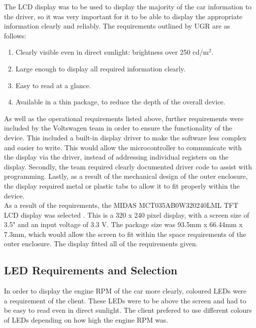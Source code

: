 \documentclass[a4paper,12pt]{article}
\begin{document}
The LCD display was to be used to display the majority of the car information to the driver, so it was very important for it to be able to display the appropriate information clearly and reliably. The requirements outlined by UGR are as follows:

\begin{enumerate}
  \item Clearly visible even in direct sunlight: brightness over 250 cd/$\textrm{m}^2$.
  \item Large enough to display all required information clearly.
  \item Easy to read at a glance.
  \item Available in a thin package, to reduce the depth of the overall device.
\end{enumerate}

As well as the operational requirements listed above, further requirements were included by the Voltswagen team in order to ensure the functionality of the device. This included a built-in display driver to make the software less complex and easier to write. This would allow the microcontroller to communicate with the display via the driver, instead of addressing individual registers on the display. Secondly, the team required clearly documented driver code to assist with programming. Lastly, as a result of the mechanical design of the outer enclosure, the display required metal or plastic tabs to allow it to fit properly within the device. \\

As a result of the requirements, the MIDAS MCT035AB0W320240LML TFT LCD display was selected \cite{display_datasheet}. This is a 320 x 240 pixel display, with a screen size of 3.5" and an input voltage of 3.3 V. The package size was 93.5mm x 66.44mm x 7.3mm, which would allow the screen to fit within the space requirements of the outer enclosure. The display fitted all of the requirements given.

\subsection{LED Requirements and Selection}
\label{sec:LEDs}

In order to display the engine RPM of the car more clearly, coloured LEDs were a requirement of the client. These LEDs were to be above the screen and had to be easy to read even in direct sunlight. The client prefered to use different colours of LEDs depending on how high the engine RPM was. \\
\end{document}
